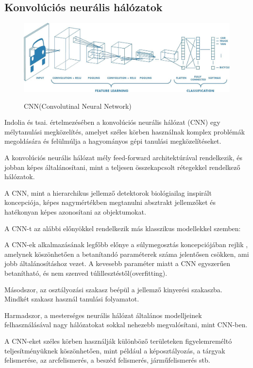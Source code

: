 \documentclass[12pt,a4]{article}
\begin{document}
	\subsection{Konvolúciós neurális hálózatok}
	\begin{figure}[h]	
		\centering
		\includegraphics[width=1\linewidth]{CNN}
        \label{fig:cnn}
		\caption{CNN(Convolutinal Neural Network)}
	\end{figure}
	Indolia és tsai. \cite{CNN} értelmezésében a konvolúciós neurális hálózat (CNN) egy
	mélytanulási megközelítés, amelyet széles körben használnak komplex problémák megoldására és felülmúlja a hagyományos gépi
	tanulási megközelítéseket.
	
	A konvolúciós neurális hálózat mély feed-forward architektúrával rendelkezik, és jobban képes általánosítani, mint a teljesen összekapcsolt rétegekkel rendelkező hálózatok.
	
	A CNN, mint a hierarchikus jellemző detektorok biológiailag inspirált koncepciója, képes nagymértékben megtanulni
	absztrakt jellemzőket és hatékonyan képes azonosítani az objektumokat.
	
	A CNN-t az alábbi előnyökkel rendelkezik más klasszikus modellekkel szemben:
	
	  A CNN-ek alkalmazásának legfőbb előnye a súlymegosztás koncepciójában rejlik
	, amelynek köszönhetően a betanítandó paraméterek száma jelentősen csökken, ami jobb általánosításhoz vezet. 
	A kevesebb paraméter miatt a CNN egyszerűen betanítható, és nem szenved túlillesztéstől(overfitting).
	
	
	Másodszor, az osztályozási szakasz beépül a jellemző kinyerési szakaszba. Mindkét szakasz használ tanulási folyamatot.
	
	
	Harmadszor, a mesterséges neurális hálózat általános modelljeinek felhasználásával nagy hálózatokat sokkal nehezebb megvalósítani,
	mint CNN-ben.
	
	
	A CNN-eket széles körben használják különböző területeken figyelemreméltó
	teljesítményüknek köszönhetően, mint például a képosztályozás, a tárgyak felismerése, az arcfelismerés, a beszéd
	felismerés, járműfelismerés stb.
	
\end{document}
